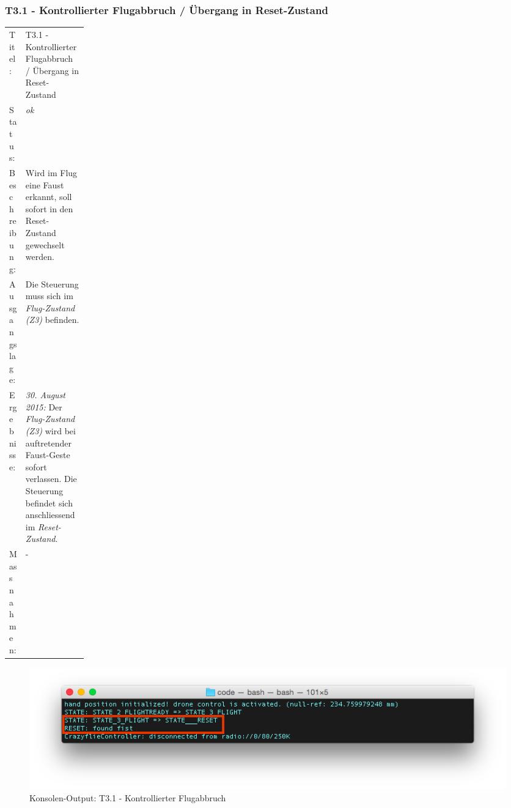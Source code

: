 \subsubsection{T3.1 - Kontrollierter Flugabbruch / Übergang in Reset-Zustand}
\begin{table}[H]
	\centering
	\small\renewcommand{\arraystretch}{1.4}
	\begin{tabularx}{0.9\textwidth}{ L{0.15\linewidth} | X  }%
		\hline
		Titel: & T3.1 - Kontrollierter Flugabbruch / Übergang in Reset-Zustand\\
		Status: & \textit{ok}\\
		Beschreibung: &  
		Wird im Flug eine Faust erkannt, soll sofort in den Reset-Zustand gewechselt werden.
		\\
		Ausgangslage: & Die Steuerung muss sich im \textit{Flug-Zustand (Z3)} befinden.\\
		Ergebnisse: & \textit{30. August 2015:}
		Der \textit{Flug-Zustand (Z3)} wird bei auftretender Faust-Geste sofort verlassen. Die Steuerung befindet sich anschliessend im \textit{Reset-Zustand}.
		\\
		Massnahmen: & -\\
		\hline
	\end{tabularx}
\end{table}
\begin{figure}[H]
	\centering
	\includegraphics[width=1.0\textwidth]{images/testing/t3_1_success_state_reset_edit.png}
	\caption{Konsolen-Output: T3.1 - Kontrollierter Flugabbruch}
	\vspace{-1\baselineskip}
\end{figure}

\newpage

